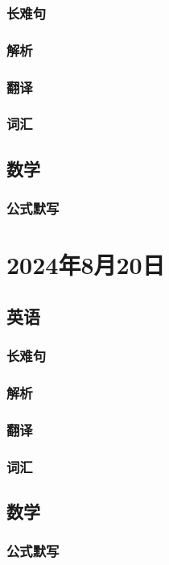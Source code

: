 \documentclass[UTF8]{ctexart}
\begin{document}
\subsubsection{长难句}
\subsubsection{解析}
\subsubsection{翻译}
\subsubsection{词汇}
\subsection{数学}
\subsubsection{公式默写}
\begin{multicols}{2}
\end{multicols}
\section{2024年8月20日}
\subsection{英语}
\subsubsection{长难句}
\subsubsection{解析}
\subsubsection{翻译}
\subsubsection{词汇}
\subsection{数学}
\subsubsection{公式默写}
\begin{multicols}{2}
\end{multicols}
\end{document}
